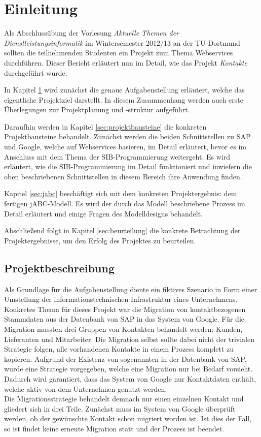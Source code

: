 \javalstset{}{}
\section{Einleitung}
\label{sec:einleitung}
Als Abschlussübung der Vorlesung \emph{Aktuelle Themen der Dienstleistungsinformatik} im Wintersemester
 2012/13 an der TU-Dortmund sollten die teilnehmenden Studenten ein Projekt zum Thema Webservices
 durchführen. Dieser Bericht erläutert nun im Detail, wie das Projekt \textit{Kontakte} durchgeführt wurde.

In Kapitel \ref{sec:einleitung} wird zunächst die genaue Aufgabenstellung erläutert, welche das
 eigentliche Projektziel darstellt. In diesem Zusammenhang werden auch erste Überlegungen zur Projektplanung
 und -struktur aufgeführt.

Daraufhin werden in Kapitel \ref{sec:projektbausteine} die konkreten Projektbausteine behandelt. Zunächst
 werden die beiden Schnittstellen zu SAP und Google, welche auf Webservices basieren, im Detail erläutert,
 bevor es im Anschluss mit dem Thema der SIB-Programmierung weitergeht. Es wird erläutert, wie die
 SIB-Programmierung im Detail funktioniert und inwiefern die oben beschriebenen Schnittstellen in diesem
 Bereich ihre Anwendung finden.

Kapitel \ref{sec:jabc} beschäftigt sich mit dem konkreten Projektergebnis: dem fertigen jABC-Modell.
 Es wird der durch das Modell beschriebene Prozess im Detail erläutert und einige Fragen des Modelldesigns behandelt.

Abschließend folgt in Kapitel \ref{sec:beurteilung} die konkrete Betrachtung der Projektergebnisse,
 um den Erfolg des Projektes zu beurteilen. 


\subsection{Projektbeschreibung}
Als Grundlage für die Aufgabenstellung diente ein fiktives Szenario in Form einer Umstellung der
 informationstechnischen Infrastruktur eines Unternehmens. Konkretes Thema für dieses Projekt war die
 Migration von kontaktbezogenen Stammdaten aus der Datenbank von SAP in das System von Google.
Für die Migration mussten drei Gruppen von Kontakten behandelt werden: Kunden, Lieferanten und Mitarbeiter.
Die Migration selbst sollte dabei nicht der trivialen Strategie folgen, alle vorhandenen Kontakte
 in einem Prozess komplett zu kopieren.
Aufgrund der Existenz von sogenannten  in der Datenbank von SAP, wurde
 eine Strategie vorgegeben, welche eine Migration nur bei Bedarf vorsieht.
Dadurch wird garantiert, dass das System von Google nur Kontaktdaten enthält, welche aktiv von dem
 Unternehmen genutzt werden.\\
Die Migrationsstrategie behandelt demnach nur einen einzelnen Kontakt und gliedert sich in drei Teile.
Zunächst muss im System von Google überprüft werden, ob der gewünschte Kontakt schon migriert worden ist.
Ist dies der Fall, so ist findet keine erneute Migration statt und der Prozess ist beendet.

